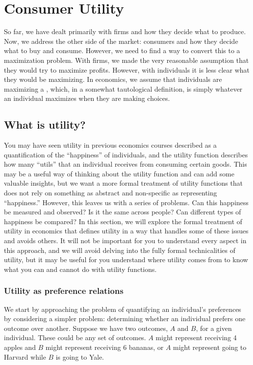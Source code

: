 \chapter{Consumer Utility}
So far, we have dealt primarily with firms and how they decide what to produce. Now, we address the other side of the market: consumers and how they decide what to buy and consume. However, we need to find a way to convert this to a maximization problem. With firms, we made the very reasonable assumption that they would try to maximize profits. However, with individuals it is less clear what they would be maximizing. In economics, we assume that individuals are maximizing a , which, in a somewhat tautological definition, is simply whatever an individual maximizes when they are making choices. 

\section{What is utility?}
You may have seen utility in previous economics courses described as a quantification of the ``happiness'' of individuals, and the utility function describes how many ``utils'' that an individual receives from consuming certain goods. This may be a useful way of thinking about the utility function and can add some valuable insights, but we want a more formal treatment of utility functions that does not rely on something as abstract and non-specific as representing ``happiness.'' However, this leaves us with a series of problems. Can this happiness be measured and observed? Is it the same across people? Can different types of happiness be compared? In this section, we will explore the formal treatment of utility in economics that defines utility in a way that handles some of these issues and avoids others. It will not be important for you to understand every aspect in this approach, and we will avoid delving into the fully formal technicalities of utility, but it may be useful for you understand where utility comes from to know what you can and cannot do with utility functions.

\subsection*{Utility as preference relations}
We start by approaching the problem of quantifying an individual's preferences by considering a simpler problem: determining whether an individual prefers one outcome over another. Suppose we have two outcomes, $A$ and $B$, for a given individual. These could be any set of outcomes. $A$ might represent receiving 4 apples and $B$ might represent receiving 6 bananas, or $A$ might represent going to Harvard while $B$ is going to Yale.

